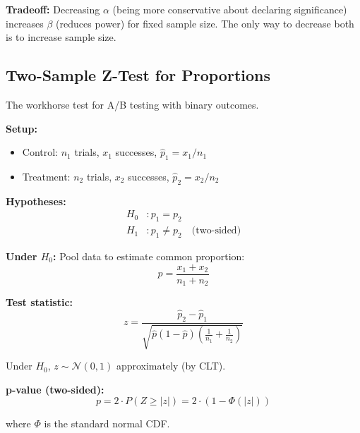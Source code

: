 \textbf{Tradeoff:} Decreasing $\alpha$ (being more conservative about declaring significance) increases $\beta$ (reduces power) for fixed sample size. The only way to decrease both is to increase sample size.

\subsection{Two-Sample Z-Test for Proportions}

The workhorse test for A/B testing with binary outcomes.

\textbf{Setup:}
\begin{itemize}
    \item Control: $n_1$ trials, $x_1$ successes, $\hat{p}_1 = x_1/n_1$
    \item Treatment: $n_2$ trials, $x_2$ successes, $\hat{p}_2 = x_2/n_2$
\end{itemize}

\textbf{Hypotheses:}
\begin{align}
H_0&: p_1 = p_2 \\
H_1&: p_1 \neq p_2 \quad \text{(two-sided)}
\end{align}

\textbf{Under $H_0$:} Pool data to estimate common proportion:
\begin{equation}
\hat{p} = \frac{x_1 + x_2}{n_1 + n_2}
\end{equation}

\textbf{Test statistic:}
\begin{equation}
z = \frac{\hat{p}_2 - \hat{p}_1}{\sqrt{\hat{p}(1-\hat{p})\left(\frac{1}{n_1} + \frac{1}{n_2}\right)}}
\end{equation}

Under $H_0$, $z \sim \mathcal{N}(0, 1)$ approximately (by CLT).

\textbf{p-value (two-sided):}
\begin{equation}
p = 2 \cdot P(Z \geq |z|) = 2 \cdot (1 - \Phi(|z|))
\end{equation}

where $\Phi$ is the standard normal CDF.

